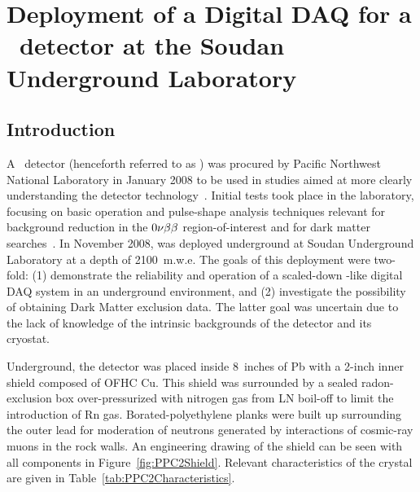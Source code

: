 
\chapter{Deployment of a Digital DAQ for a \ppc~detector at the Soudan Underground Laboratory}
\label{chap:DeploymentPPC2Soudan}
	\section{Introduction}
	\label{sec:DeploymentPPC2SoudanIntro}
			
		A \ppc~detector (henceforth referred to as ) was procured by Pacific Northwest National Laboratory in January 2008 to be used in studies aimed at more clearly understanding the detector technology~\cite{Orr2007}.  Initial tests took place in the laboratory, focusing on basic operation and pulse-shape analysis techniques relevant for background reduction in the $0 \nu \beta \beta$ region-of-interest and for dark matter searches~\cite{Orr2008}.  In November 2008,  was deployed underground at Soudan Underground Laboratory at a depth of 2100~m.w.e.  The goals of this deployment were two-fold: (1) demonstrate the reliability and operation of a scaled-down \MJ-like digital DAQ system in an underground environment, and (2) investigate the possibility of obtaining Dark Matter exclusion data.  The latter goal was uncertain due to the lack of knowledge of the intrinsic backgrounds of the detector and its cryostat.  
		
		Underground, the detector was placed inside 8~inches of Pb with a 2-inch inner shield composed of OFHC Cu.  This shield was surrounded by a sealed radon-exclusion box over-pressurized with nitrogen gas from LN boil-off to limit the introduction of Rn gas.  Borated-polyethylene planks were built up surrounding the outer lead for moderation of neutrons generated by interactions of cosmic-ray muons in the rock walls.  An engineering drawing of the shield can be seen %
with all components in Figure~\ref{fig:PPC2Shield}.  Relevant characteristics of the crystal are given in Table~\ref{tab:PPC2Characteristics}.
	
	
